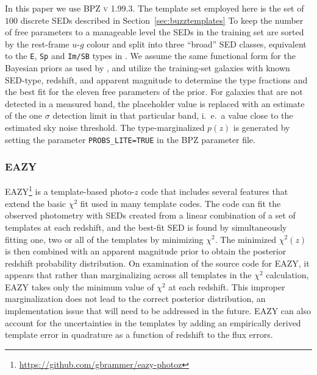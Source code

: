 In this paper we use \textsc{BPZ v 1.99.3}. The template set employed here is the set of $100$ discrete SEDs described in Section~\ref{sec:buzztemplates}
To keep the number of free parameters to a manageable level the SEDs in the training set are sorted by the rest-frame $u$-$g$ colour and split into three ``broad'' SED classes, equivalent to the \texttt{E}, \texttt{Sp} and \texttt{Im/SB} types in \citet{Benitez:00}. We assume the same functional form for the Bayesian priors as used by \citet{Benitez:00}, and utilize the training-set galaxies with known SED-type, redshift, and apparent magnitude to determine the type fractions and the best fit for the eleven free parameters of the prior.
For galaxies that are not detected in a measured band, the placeholder value is replaced with an estimate of the one $\sigma$ detection limit in that particular band, i.~e.~a value close to the estimated sky noise threshold.
The type-marginalized $p(z)$ is generated by setting the parameter \texttt{PROBS\_LITE=TRUE} in the \textsc{BPZ} parameter file.

\subsubsection{EAZY} \label{sec:eazy}

\textsc{EAZY}\footnote{\url{https://github.com/gbrammer/eazy-photoz}} \citep[Easy and Accurate Photometric Redshifts from Yale,][]{Brammer:08} is a template-based photo-$z$ code that includes several features that extend the basic $\chi^2$ fit used in many template codes.  The code can fit the observed photometry with SEDs created from a linear combination of a set of templates at each redshift, and the best-fit SED is found by simultaneously fitting one, two or all of the templates by minimizing $\chi^2$. The minimized $\chi^2(z)$ is then combined with an apparent magnitude prior to obtain the posterior redshift probability distribution.  On examination of the source code for EAZY, it appears that rather than marginalizing across all templates in the $\chi^2$ calculation, \textsc{EAZY} takes only the minimum value of $\chi^2$ at each redshift.  This improper marginalization does not lead to the correct posterior distribution, an implementation issue that will need to be addressed in the future.
\textsc{EAZY} can also account for the uncertainties in the templates by adding an empirically derived template error in quadrature as a function of redshift to the flux errors.


